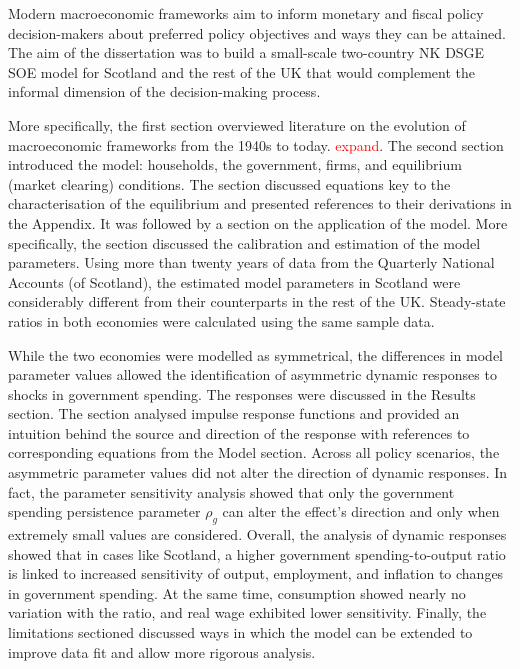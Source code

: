 Modern macroeconomic frameworks aim to inform monetary and fiscal policy decision-makers about preferred policy objectives and ways they can be attained. The aim of the dissertation was to build a small-scale two-country NK DSGE SOE model for Scotland and the rest of the UK that would complement the informal dimension of the decision-making process. 

More specifically, the first section overviewed literature on the evolution of macroeconomic frameworks from the 1940s to today. \textcolor{red}{expand}. The second section introduced the model: households, the government, firms, and equilibrium (market clearing) conditions. The section discussed equations key to the characterisation of the equilibrium and presented references to their derivations in the Appendix. It was followed by a section on the application of the model. More specifically, the section discussed the calibration and estimation of the model parameters. Using more than twenty years of data from the Quarterly National Accounts (of Scotland), the estimated model parameters in Scotland were considerably different from their counterparts in the rest of the UK. Steady-state ratios in both economies were calculated using the same sample data. 

While the two economies were modelled as symmetrical, the differences in model parameter values allowed the identification of asymmetric dynamic responses to shocks in government spending. The responses were discussed in the Results section. The section analysed impulse response functions and provided an intuition behind the source and direction of the response with references to corresponding equations from the Model section. Across all policy scenarios, the asymmetric parameter values did not alter the direction of dynamic responses. In fact, the parameter sensitivity analysis showed that only the government spending persistence parameter $\rho_g$ can alter the effect's direction and only when extremely small values are considered. Overall, the analysis of dynamic responses showed that in cases like Scotland, a higher government spending-to-output ratio is linked to increased sensitivity of output, employment, and inflation to changes in government spending. At the same time, consumption showed nearly no variation with the ratio, and real wage exhibited lower sensitivity. Finally, the limitations sectioned discussed ways in which the model can be extended to improve data fit and allow more rigorous analysis.